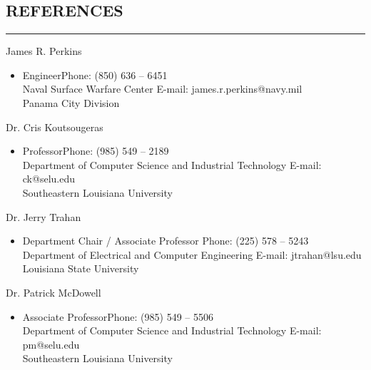 \documentclass{res}
\begin{document}
\begin{resume}
\section{REFERENCES}
	\vspace{0.005in}	
	\rule{\textwidth}{0.5pt}
	James R. Perkins
	\begin{itemize}
		\item[] Engineer\hfill {Phone: (850) 636 – 6451}\\
		Naval Surface Warfare Center \hfill{E-mail: james.r.perkins@navy.mil}\\
		Panama City Division
	\end{itemize}
	
	Dr. Cris Koutsougeras
	\begin{itemize}
		\item[] Professor\hfill {Phone: (985) 549 – 2189}\\
		Department of Computer Science and Industrial Technology \hfill{E-mail: ck@selu.edu}\\
		Southeastern Louisiana University
	\end{itemize}
	
	Dr. Jerry Trahan
	\begin{itemize}
		\item[] Department Chair / Associate Professor \hfill {Phone: (225) 578 – 5243}\\
		Department of Electrical and Computer Engineering \hfill{E-mail: jtrahan@lsu.edu}\\
		Louisiana State University
	\end{itemize}

	Dr. Patrick McDowell
	\begin{itemize}
		\item[] Associate Professor\hfill {Phone: (985) 549 – 5506}\\
		Department of Computer Science and Industrial Technology \hfill{E-mail: pm@selu.edu}\\
		Southeastern Louisiana University
	\end{itemize}



\end{resume}
\end{document}
